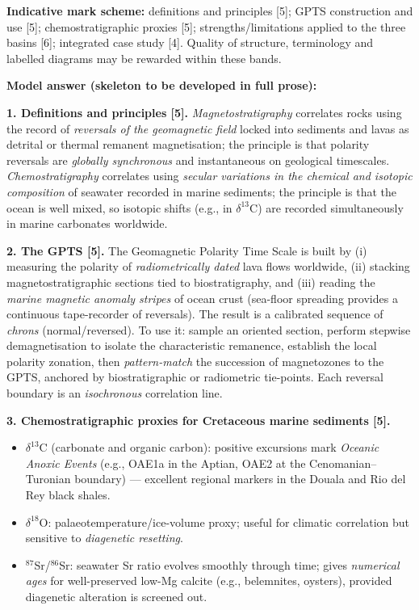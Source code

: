 \documentclass[11pt]{article}
\begin{document}
\begin{corrige}
\textbf{Indicative mark scheme:} definitions and principles [5]; GPTS construction and use [5]; chemostratigraphic proxies [5]; strengths/limitations applied to the three basins [6]; integrated case study [4]. Quality of structure, terminology and labelled diagrams may be rewarded within these bands.

\textbf{Model answer (skeleton to be developed in full prose):}

\textbf{1. Definitions and principles [5].}
\emph{Magnetostratigraphy} correlates rocks using the record of \emph{reversals of the geomagnetic field} locked into sediments and lavas as detrital or thermal remanent magnetisation; the principle is that polarity reversals are \emph{globally synchronous} and instantaneous on geological timescales. \emph{Chemostratigraphy} correlates using \emph{secular variations in the chemical and isotopic composition} of seawater recorded in marine sediments; the principle is that the ocean is well mixed, so isotopic shifts (e.g., in $\delta^{13}$C) are recorded simultaneously in marine carbonates worldwide.

\textbf{2. The GPTS [5].}
The Geomagnetic Polarity Time Scale is built by (i) measuring the polarity of \emph{radiometrically dated} lava flows worldwide, (ii) stacking magnetostratigraphic sections tied to biostratigraphy, and (iii) reading the \emph{marine magnetic anomaly stripes} of ocean crust (sea-floor spreading provides a continuous tape-recorder of reversals). The result is a calibrated sequence of \emph{chrons} (normal/reversed). To use it: sample an oriented section, perform stepwise demagnetisation to isolate the characteristic remanence, establish the local polarity zonation, then \emph{pattern-match} the succession of magnetozones to the GPTS, anchored by biostratigraphic or radiometric tie-points. Each reversal boundary is an \emph{isochronous} correlation line.

\textbf{3. Chemostratigraphic proxies for Cretaceous marine sediments [5].}
\begin{itemize}
\item $\delta^{13}$C (carbonate and organic carbon): positive excursions mark \emph{Oceanic Anoxic Events} (e.g., OAE1a in the Aptian, OAE2 at the Cenomanian--Turonian boundary) — excellent regional markers in the Douala and Rio del Rey black shales.
\item $\delta^{18}$O: palaeotemperature/ice-volume proxy; useful for climatic correlation but sensitive to \emph{diagenetic resetting}.
\item $^{87}$Sr/$^{86}$Sr: seawater Sr ratio evolves smoothly through time; gives \emph{numerical ages} for well-preserved low-Mg calcite (e.g., belemnites, oysters), provided diagenetic alteration is screened out.
\end{itemize}


\end{corrige}
\end{document}
